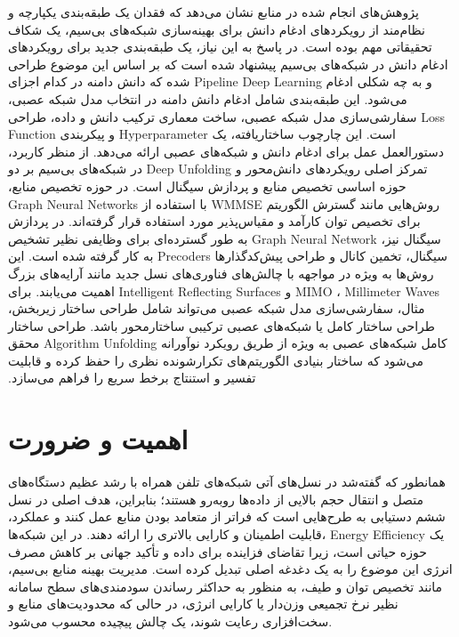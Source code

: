 پژوهش‌های انجام شده در منابع نشان می‌دهد که فقدان یک طبقه‌بندی یکپارچه و نظام‌مند از رویکردهای ادغام دانش برای بهینه‌سازی شبکه‌های بی‌سیم، یک شکاف تحقیقاتی مهم بوده است. در پاسخ به این نیاز، یک طبقه‌بندی جدید برای رویکردهای ادغام دانش در شبکه‌های بی‌سیم پیشنهاد شده است که بر اساس این موضوع طراحی شده که دانش دامنه در کدام اجزای 
\gls{Pipeline}
\gls{Deep Learning}
و به چه شکلی ادغام می‌شود. این طبقه‌بندی شامل ادغام دانش دامنه در انتخاب مدل شبکه عصبی، سفارشی‌سازی مدل شبکه عصبی، ساخت معماری ترکیب دانش و داده، طراحی 
\gls{Loss Function}
 و پیکربندی 
\gls{Hyperparameter}
  است. این چارچوب ساختاریافته، یک دستورالعمل عمل برای ادغام دانش و شبکه‌های عصبی ارائه می‌دهد.‬
‫از منظر کاربرد، تمرکز اصلی رویکردهای دانش‌محور و 
\gls{Deep Unfolding}
 در شبکه‌های بی‌سیم بر دو حوزه اساسی تخصیص منابع و پردازش سیگنال است. در حوزه تخصیص منابع، روش‌هایی مانند گسترش الگوریتم 
\gls{WMMSE}
 با استفاده از
\glspl{Graph Neural Network}
 برای تخصیص توان کارآمد و مقیاس‌پذیر مورد استفاده قرار گرفته‌اند. در پردازش سیگنال نیز، 
\gls{Graph Neural Network}
  به طور گسترده‌ای برای وظایفی نظیر تشخیص سیگنال، تخمین کانال و طراحی پیش‌کدگذارها 
\glspl{Precoder}
   به کار گرفته شده است. این روش‌ها به ویژه در مواجهه با چالش‌های فناوری‌های نسل جدید مانند آرایه‌های بزرگ 
\gls{MIMO}
   ، 
\glspl{Millimeter Wave}
   و 
\glspl{Intelligent Reflecting Surface}
 اهمیت می‌یابند. برای مثال، سفارشی‌سازی مدل شبکه عصبی می‌تواند شامل طراحی ساختار زیربخش، طراحی ساختار کامل یا شبکه‌های عصبی ترکیبی ساختارمحور باشد. طراحی ساختار کامل شبکه‌های عصبی به ویژه از طریق رویکرد نوآورانه 
\gls{Algorithm Unfolding}
    محقق می‌شود که ساختار بنیادی الگوریتم‌های تکرارشونده نظری را حفظ کرده و قابلیت تفسیر و استنتاج برخط سریع را فراهم می‌سازد.‬
    ‬
\section{اهمیت و ضرورت}
‫‬همانطور که گفته‌شد در نسل‌های آتی شبکه‌های تلفن همراه با رشد عظیم دستگاه‌های متصل و انتقال حجم بالایی از داده‌ها روبه‌رو هستند؛ بنابراین، هدف اصلی در نسل ششم دستیابی به طرح‌هایی است که فراتر از متعامد بودن منابع عمل کنند و عملکرد، قابلیت اطمینان و کارایی بالاتری را ارائه دهند. در این شبکه‌ها،
\gls{Energy Efficiency}
 یک حوزه حیاتی است، زیرا تقاضای فزاینده برای داده و تأکید جهانی بر کاهش مصرف انرژی این موضوع را به یک دغدغه اصلی تبدیل کرده است. مدیریت بهینه منابع بی‌سیم، مانند تخصیص توان و طیف، به منظور به حداکثر رساندن سودمندی‌های سطح سامانه نظیر نرخ تجمیعی وزن‌دار یا کارایی انرژی، در حالی که محدودیت‌های منابع و سخت‌افزاری رعایت شوند، یک چالش پیچیده محسوب می‌شود.‬
 
